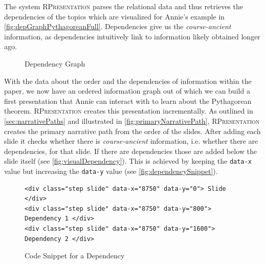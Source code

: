 \documentclass[twoside, 12pt]{article}
\newcommand{\sys}{\textsc{RPresentation}\xspace}
\begin{document}

The system \sys parses the relational data and thus retrieves the dependencies of the topics which are visualized for Annie's example in \autoref{fig:depGraphPythagoreanFull}. Dependencies give us the \textit{course-ancient} information, as dependencies intuitively link to information likely obtained longer ago.\\

\begin{figure}
\vspace{-30pt}
  \begin{center}
\vspace{-20pt}
  \caption{Dependency Graph}
  \label{fig:depGraphPythagoreanFull}
\vspace{0pt}
  \end{center}
\end{figure}

\begin{figure}
\vspace{-60pt}
\end{figure}

With the data about the order and the dependencies of information within the paper, we now have an ordered information graph out of which we can build a first presentation that Annie can interact with to learn about the Pythagorean theorem. \sys creates this presentation incrementally. As outlined in \autoref{sec:narrativePaths} and illustrated in \autoref{fig:primaryNarrativePath}, \sys creates the primary narrative path from the order of the slides. After adding each slide it checks whether there is \textit{course-ancient} information, i.e. whether there are dependencies, for that slide. If there are dependencies those are added below the slide itself (see \autoref{fig:visualDependency}). This is achieved by keeping the \texttt{data-x} value but increasing the \texttt{data-y} value (see \autoref{fig:dependencySnippet}).

\begin{figure}
\vspace{-0pt}
\begin{verbatim}
<div class="step slide" data-x="8750" data-y="0"> Slide </div>
<div class="step slide" data-x="8750" data-y="800"> Dependency 1 </div>
<div class="step slide" data-x="8750" data-y="1600"> Dependency 2 </div>
\end{verbatim}
\vspace{-8pt}
  \caption{Code Snippet for a Dependency}
  \label{fig:dependencySnippet}
  \vspace{12pt}
\end{figure}
\end{document}
